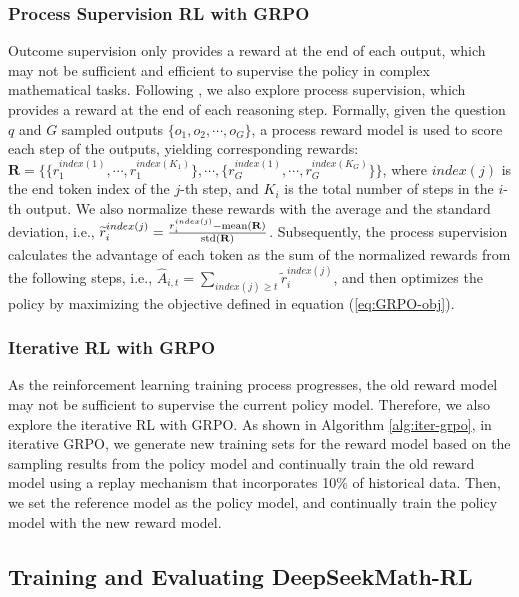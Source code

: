 \subsubsection{Process Supervision RL with GRPO} Outcome supervision only provides a reward at the end of each output, which may not be sufficient and efficient to supervise the policy in complex mathematical tasks. Following \cite{wang2023math}, we also explore process supervision, which provides a reward at the end of each reasoning step. Formally, given the question $q$ and $G$  sampled outputs $\{o_1, o_2, \cdots, o_G\}$, a process reward model is used to score each step of the outputs, yielding corresponding rewards: $\mathbf{R} = \{ \{r_1^{index(1)},\cdots,r_1^{index(K_1)}\}, \cdots,  \{r_G^{index(1)},\cdots,r_G^{index(K_G)}\} \}$, where $index(j)$ is the end token index of the $j$-th step, and $K_i$ is the total number of steps in the $i$-th output. We also normalize these rewards with the average and the standard deviation, i.e., $\widetilde{r}_i^{index(j)} = \frac{r_i^{index(j)} - {\rm mean(\mathbf{R})}}{{\rm std(\mathbf{R})}}$.
Subsequently, the process supervision calculates the advantage of each token as the sum of the normalized rewards from the following steps, i.e., $\hat{A}_{i, t} = \sum_{index(j) \ge t} \widetilde{r}_i^{index(j)}$,
and then optimizes the policy by maximizing the objective defined in equation (\ref{eq:GRPO-obj}).

\subsubsection{Iterative RL with GRPO} As the reinforcement learning training process progresses, the old reward model may not be sufficient to supervise the current policy model. Therefore, we also explore the iterative RL with GRPO. As shown in Algorithm \ref{alg:iter-grpo}, in iterative GRPO, we generate new training sets for the reward model based on the sampling results from the policy model and continually train the old reward model using a replay mechanism that incorporates 10\% of historical data. Then, we set the reference model as the policy model, and continually train the policy model with the new reward model.

\subsection{Training and Evaluating DeepSeekMath-RL}

